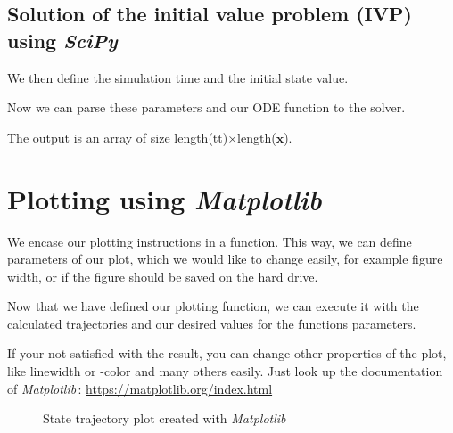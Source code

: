 \documentclass[a4paper,11pt,headings=standardclasses]{scrartcl}%
\newcommand{\scipy}{\emph{SciPy}\,}
\newcommand{\mpl}{\emph{Matplotlib}\,}
\begin{document}
\subsection{Solution of the initial value problem (IVP) using \scipy}
We then define the simulation time and the initial state value.

Now we can parse these parameters and our ODE function to the solver.

The output is an array of size length(tt)$\times$length($\mathbf{x}$).

\section{Plotting using \mpl}
\label{sec:plot}
We encase our plotting instructions in a function. This way, we can define parameters of our plot, which we would like to change easily, for example figure width, or if the figure should be saved on the hard drive.

Now that we have defined our plotting function, we  can execute it with the calculated trajectories and our desired values for the functions parameters.

If your not satisfied with the result, you can change other properties of the plot, like linewidth or -color and many others easily. Just look up the documentation of \mpl : \url{https://matplotlib.org/index.html}
\begin{figure}[h]
\label{fig:state_traj}
   \centering      
         
 \caption{State trajectory plot created with \mpl}
 \label{fig:Test}
\end{figure} 
\newpage
\end{document}
